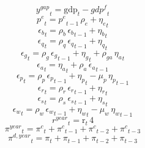 \begin{dmath}
{{y^{gap}}}_{t}={{\mathrm{gdp}}}_{t}-{{gdp^{f}}}_{t}
\end{dmath}
\begin{dmath}
{{p^{e}}}_{t}={{p^{e}}}_{t-1}\, {{\rho_{e}}}+{{\eta_{e}}}_{t}
\end{dmath}
\begin{dmath}
{{\epsilon_{b}}}_{t}={{\rho_{b}}}\, {{\epsilon_{b}}}_{t-1}+{{\eta_{b}}}_{t}
\end{dmath}
\begin{dmath}
{{\epsilon_{q}}}_{t}={{\rho_{q}}}\, {{\epsilon_{q}}}_{t-1}+{{\eta_{q}}}_{t}
\end{dmath}
\begin{dmath}
{{\epsilon_{g}}}_{t}={{\rho_{g}}}\, {{\epsilon_{g}}}_{t-1}+{{\eta_{g}}}_{t}+{{\rho_{ga}}}\, {{\eta_{a}}}_{t}
\end{dmath}
\begin{dmath}
{{\epsilon_{a}}}_{t}={{\eta_{a}}}_{t}+{{\rho_{a}}}\, {{\epsilon_{a}}}_{t-1}
\end{dmath}
\begin{dmath}
{{\epsilon_{p}}}_{t}={{\rho_{p}}}\, {{\epsilon_{p}}}_{t-1}+{{\eta_{p}}}_{t}-{{\mu_{p}}}\, {{\eta_{p}}}_{t-1}
\end{dmath}
\begin{dmath}
{{\epsilon_{r}}}_{t}={{\rho_{r}}}\, {{\epsilon_{r}}}_{t-1}+{{\eta_{r}}}_{t}
\end{dmath}
\begin{dmath}
{{\epsilon_{s}}}_{t}={{\rho_{s}}}\, {{\epsilon_{s}}}_{t-1}+{{\eta_{s}}}_{t}
\end{dmath}
\begin{dmath}
{{\epsilon_{w}}}_{t}={{\rho_{w}}}\, {{\epsilon_{w}}}_{t-1}+{{\eta_{w}}}_{t}-{{\mu_{w}}}\, {{\eta_{w}}}_{t-1}
\end{dmath}
\begin{dmath}
{{r^{year}}}_{t}={{\mathrm{r}}}_{t}\, 4
\end{dmath}
\begin{dmath}
{{\pi^{year}}}_{t}={{\pi^{c}}}_{t}+{{\pi^{c}}}_{t-1}+{{\pi^{c}}}_{t-2}+{{\pi^{c}}}_{t-3}
\end{dmath}
\begin{dmath}
{{\pi^{d,year}}}_{t}={{\pi}}_{t}+{{\pi}}_{t-1}+{{\pi}}_{t-2}+{{\pi}}_{t-3}
\end{dmath}
